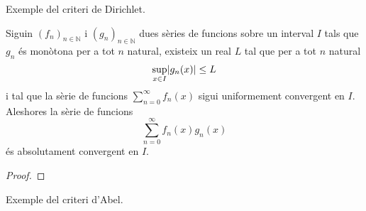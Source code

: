 \documentclass[../../Main.tex]{subfiles}
\begin{document}
	\begin{example}
		Exemple del criteri de Dirichlet.
		\begin{solution}
		\end{solution}
	\end{example}
	\begin{theorem}
		\label{thm:criteri d'Abel}
		Siguin \((f_{n})_{n\in\mathbb{N}}\) i \((g_{n})_{n\in\mathbb{N}}\) dues sèries de funcions sobre un interval \(I\) tals que \(g_{n}\) és monòtona per a tot \(n\) natural, existeix un real \(L\) tal que per a tot \(n\) natural
		\[\sup_{x\in I}\abs{g_{n}(x)}\leq L\]
		i tal que la sèrie de funcions \(\sum_{n=0}^{\infty}f_{n}(x)\) sigui uniformement convergent en \(I\). Aleshores la sèrie de funcions
		\[\sum_{n=0}^{\infty}f_{n}(x)g_{n}(x)\]
		és absolutament convergent en \(I\).
		\begin{proof}
		\end{proof}
	\end{theorem}
	\begin{example}
		Exemple del criteri d'Abel.
		\begin{solution}
		\end{solution}
	\end{example}
\end{document}
